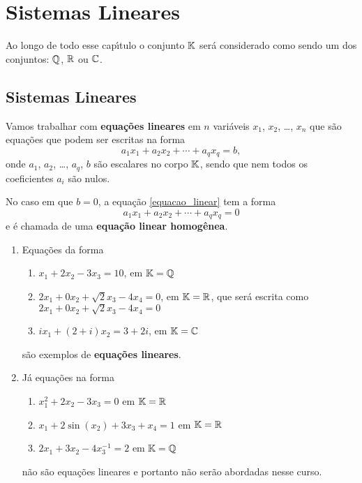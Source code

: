 
\chapter{Sistemas Lineares}

Ao longo de todo esse cap{\'\i}tulo o conjunto $\mathbb{K}$ ser\'a considerado como sendo um dos conjuntos: $\mathbb{Q}$, $\mathbb{R}$ ou $\mathbb{C}$.

\section{Sistemas Lineares}\label{ssub:sistemas_lineares}
Vamos trabalhar com \textbf{equa\c{c}\~oes lineares} em $n$ vari\'aveis $x_1$, $x_2$, \dots, $x_n$ que s\~ao equa\c{c}\~oes que podem ser escritas na forma
\begin{equation}\label{equacao_linear}
    a_1x_1  + a_2x_2 +  \cdots + a_qx_q  = b,
\end{equation}
onde $a_1$, $a_2$, \dots, $a_q$, $b$ s\~ao escalares no corpo $\mathbb{K}$, sendo que nem todos os coeficientes $a_i$ s\~ao nulos.

No caso em que $b = 0$,  a equa\c{c}\~ao \eqref{equacao_linear} tem a forma
\begin{equation}
    a_1x_1 + a_2x_2 + \cdots + a_qx_q = 0
\end{equation}
e \'e chamada de uma \textbf{equa\c{c}\~ao linear homog\^enea}.

\begin{exemplos}
    \begin{enumerate}[label={\arabic*})]
        \item Equa\c{c}\~oes da forma
            \begin{enumerate}
                \item $x_1 + 2x_2 - 3x_3 = 10$, em $\mathbb{K} = \mathbb{Q}$
                \item $2x_1 + 0x_2 + \sqrt{2}x_3 - 4x_4 = 0$, em $\mathbb{K} = \mathbb{R}$, que ser\'a escrita como $2x_1 + 0x_2 + \sqrt{2}x_3 - 4x_4 = 0$
                \item $ix_1 + (2 +i)x_2 = 3 + 2i$, em $\mathbb{K} = \mathbb{C}$
            \end{enumerate}
        s\~ao exemplos de \textbf{equa\c{c}\~oes lineares}.

        \item J\'a equa\c{c}\~oes na forma
            \begin{enumerate}
                \item $x_1^2 + 2x_2 - 3x_3 = 0$ em $\mathbb{K} = \mathbb{R}$
                \item $x_1 + 2\sin(x_2) + 3x_3 + x_ 4 = 1$ em $\mathbb{K} = \mathbb{R}$
                \item $2x_1 + 3x_2 - 4x_3^{-1} = 2$ em $\mathbb{K} = \mathbb{Q}$
            \end{enumerate}
        n\~ao s\~ao equa\c{c}\~oes lineares e portanto n\~ao ser\~ao abordadas nesse curso.
    \end{enumerate}
\end{exemplos}

